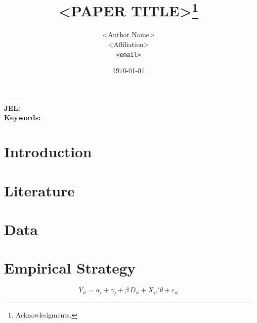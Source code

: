 \documentclass[12pt]{article}
\title{\textbf{<PAPER TITLE>}\thanks{Acknowledgments.}}
\author{<Author Name>\\<Affiliation>\\\texttt{<email>}}
\date{\today}
\begin{document}
\maketitle

\begin{abstract}
\noindent
\end{abstract}

\medskip
\noindent\textbf{JEL:} %
\\\textbf{Keywords:} %

\section{Introduction}
\label{sec:intro}

\section{Literature}
\label{sec:lit}

\section{Data}
\label{sec:data}
% 

\section{Empirical Strategy}
\label{sec:strategy}
\begin{equation}
Y_{it} = \alpha_i + \gamma_t + \beta \, D_{it} + X_{it}' \theta + \varepsilon_{it}
\label{eq:main}
\end{equation}
\end{document}
